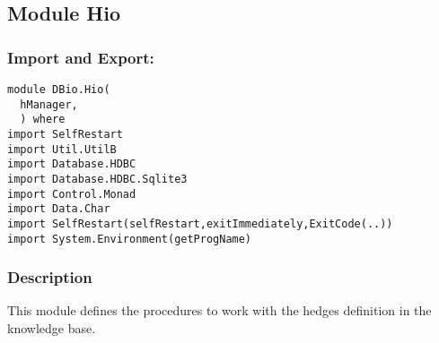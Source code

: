\documentclass[../gr-final.tex]{subfiles}
\begin{document}
\subsection{Module Hio}
\subsubsection{Import and Export:}
\begin{lstlisting}
module DBio.Hio(
  hManager,
  ) where
import SelfRestart
import Util.UtilB
import Database.HDBC
import Database.HDBC.Sqlite3
import Control.Monad
import Data.Char
import SelfRestart(selfRestart,exitImmediately,ExitCode(..))
import System.Environment(getProgName)
\end{lstlisting}
\subsubsection{Description}
This module defines the procedures to work with the hedges
definition in the knowledge base. 
\end{document}
